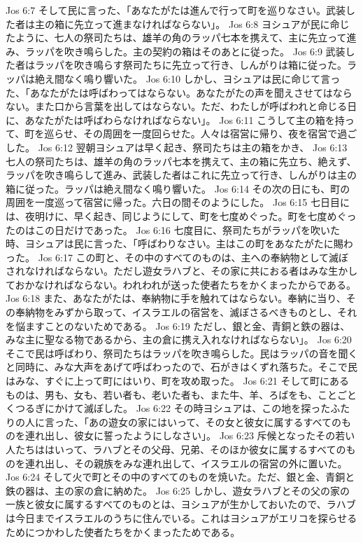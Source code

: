 Jos 6:7  そして民に言った、「あなたがたは進んで行って町を巡りなさい。武装した者は主の箱に先立って進まなければならない」。
Jos 6:8  ヨシュアが民に命じたように、七人の祭司たちは、雄羊の角のラッパ七本を携えて、主に先立って進み、ラッパを吹き鳴らした。主の契約の箱はそのあとに従った。
Jos 6:9  武装した者はラッパを吹き鳴らす祭司たちに先立って行き、しんがりは箱に従った。ラッパは絶え間なく鳴り響いた。
Jos 6:10  しかし、ヨシュアは民に命じて言った、「あなたがたは呼ばわってはならない。あなたがたの声を聞えさせてはならない。また口から言葉を出してはならない。ただ、わたしが呼ばわれと命じる日に、あなたがたは呼ばわらなければならない」。
Jos 6:11  こうして主の箱を持って、町を巡らせ、その周囲を一度回らせた。人々は宿営に帰り、夜を宿営で過ごした。
Jos 6:12  翌朝ヨシュアは早く起き、祭司たちは主の箱をかき、
Jos 6:13  七人の祭司たちは、雄羊の角のラッパ七本を携えて、主の箱に先立ち、絶えず、ラッパを吹き鳴らして進み、武装した者はこれに先立って行き、しんがりは主の箱に従った。ラッパは絶え間なく鳴り響いた。
Jos 6:14  その次の日にも、町の周囲を一度巡って宿営に帰った。六日の間そのようにした。
Jos 6:15  七日目には、夜明けに、早く起き、同じようにして、町を七度めぐった。町を七度めぐったのはこの日だけであった。
Jos 6:16  七度目に、祭司たちがラッパを吹いた時、ヨシュアは民に言った、「呼ばわりなさい。主はこの町をあなたがたに賜わった。
Jos 6:17  この町と、その中のすべてのものは、主への奉納物として滅ぼされなければならない。ただし遊女ラハブと、その家に共におる者はみな生かしておかなければならない。われわれが送った使者たちをかくまったからである。
Jos 6:18  また、あなたがたは、奉納物に手を触れてはならない。奉納に当り、その奉納物をみずから取って、イスラエルの宿営を、滅ぼさるべきものとし、それを悩ますことのないためである。
Jos 6:19  ただし、銀と金、青銅と鉄の器は、みな主に聖なる物であるから、主の倉に携え入れなければならない」。
Jos 6:20  そこで民は呼ばわり、祭司たちはラッパを吹き鳴らした。民はラッパの音を聞くと同時に、みな大声をあげて呼ばわったので、石がきはくずれ落ちた。そこで民はみな、すぐに上って町にはいり、町を攻め取った。
Jos 6:21  そして町にあるものは、男も、女も、若い者も、老いた者も、また牛、羊、ろばをも、ことごとくつるぎにかけて滅ぼした。
Jos 6:22  その時ヨシュアは、この地を探ったふたりの人に言った、「あの遊女の家にはいって、その女と彼女に属するすべてのものを連れ出し、彼女に誓ったようにしなさい」。
Jos 6:23  斥候となったその若い人たちははいって、ラハブとその父母、兄弟、そのほか彼女に属するすべてのものを連れ出し、その親族をみな連れ出して、イスラエルの宿営の外に置いた。
Jos 6:24  そして火で町とその中のすべてのものを焼いた。ただ、銀と金、青銅と鉄の器は、主の家の倉に納めた。
Jos 6:25  しかし、遊女ラハブとその父の家の一族と彼女に属するすべてのものとは、ヨシュアが生かしておいたので、ラハブは今日までイスラエルのうちに住んでいる。これはヨシュアがエリコを探らせるためにつかわした使者たちをかくまったためである。
